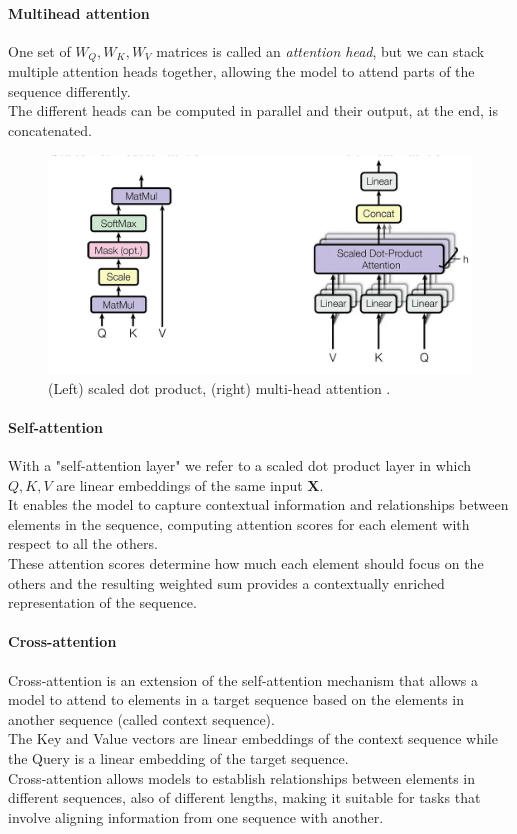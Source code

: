 \paragraph*{Multihead attention}
One set of $W_Q,W_K,W_V$ matrices is called an \textit{attention head}, but we can stack multiple attention heads together, allowing the model to attend parts of the sequence differently.\\
The different heads can be computed in parallel and their output, at the end, is concatenated.

\begin{figure}[h!]
    \centering
    \includegraphics[width=0.75\linewidth]{fig//chap05-stats/multihead_attention.png}
    \caption{(Left) scaled dot product, (right) multi-head attention \cite{Vaswani2017AttentionNeed}.}
    \label{fig:multihead}
\end{figure}

\paragraph*{Self-attention} With a "self-attention layer" we refer to a scaled dot product layer in which $Q,K,V$ are linear embeddings of the same input $\bm{X}$.\\
It enables the model to capture contextual information and relationships between elements in the sequence, computing attention scores for each element with respect to all the others.\\
These attention scores determine how much each element should focus on the others and the resulting weighted sum provides a contextually enriched representation of the sequence.

\paragraph*{Cross-attention}
Cross-attention is an extension of the self-attention mechanism that allows a model to attend to elements in a target sequence based on the elements in another sequence (called context sequence).\\
The Key and Value vectors are linear embeddings of the context sequence while the Query is a linear embedding of the target sequence.\\
Cross-attention allows models to establish relationships between elements in different sequences, also of different lengths, making it suitable for tasks that involve aligning information from one sequence with another.

